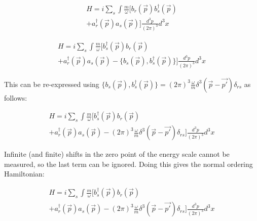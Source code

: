 \documentclass[a4]{article}
\begin{document}
    \begin{equation}
        \begin{aligned}
            H = i \sum_{s} \int \frac{m}{\omega} [b_r (\vec{p}) b_s^{\dagger} (\vec{p}) \\
        + a_r^{\dagger} (\vec{p}) a_s (\vec{p})] \frac{d^{3} p}{(2 \pi)^3} d^3 x
        \end{aligned}
    \end{equation}

    \begin{equation}
        \begin{aligned}
            H = i \sum_{s} \int \frac{m}{\omega} [b_s^{\dagger} (\vec{p}) b_r (\vec{p}) \\
        + a_r^{\dagger} (\vec{p}) a_s (\vec{p}) - \{ b_s (\vec{p}), b_s^{\dagger} (\vec{p}) \}] \frac{d^{3} p}{(2 \pi)^3} d^3 x
        \end{aligned}
    \end{equation}

    This can be re-expressed using $\{ b_s (\vec{p}), b_s^{\dagger} (\vec{p}) \} = (2 \pi)^3 \frac{\omega}{m} \delta^3 (\vec{p} - \vec{p'}) \delta_{rs}$ as follows:

    \begin{equation}
        \begin{aligned}
            H = i \sum_{s} \int \frac{m}{\omega} [b_s^{\dagger} (\vec{p}) b_r (\vec{p}) \\
        + a_r^{\dagger} (\vec{p}) a_s (\vec{p}) - (2 \pi)^3 \frac{\omega}{m} \delta^3 (\vec{p} - \vec{p'}) \delta_{rs}] \frac{d^{3} p}{(2 \pi)^3} d^3 x
        \end{aligned}
    \end{equation}

    Infinite (and finite) shifts in the zero point of the energy scale cannot be measured, so the last term can be ignored. Doing this gives the normal ordering Hamiltonian:

    \begin{framed}
        \begin{equation}
            \begin{aligned}
                H = i \sum_{s} \int \frac{m}{\omega} [b_s^{\dagger} (\vec{p}) b_r (\vec{p}) \\
            + a_r^{\dagger} (\vec{p}) a_s (\vec{p}) - (2 \pi)^3 \frac{\omega}{m} \delta^3 (\vec{p} - \vec{p'}) \delta_{rs}] \frac{d^{3} p}{(2 \pi)^3} d^3 x
            \end{aligned}
        \end{equation}
    \end{framed}
\end{document}
